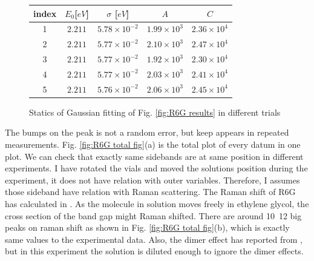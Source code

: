 \documentclass{article}
\begin{document}
\begin{figure}[H]
  \centering
  \begin{tabular}{|c| c| c|c|c|}
      index  & $E_0 $[$eV$]  & $\sigma$ [$eV$] & $A$ & $C$\\
      \hline
      1 & $2.211$ & $5.78\times 10^{-2}$ & $1.99 \times 10^3$ & $2.36 \times 10^4$\\
      2 & $2.211$ & $5.77\times 10^{-2}$ & $2.10 \times 10^3$ & $2.47 \times 10^4$\\
      3 & $2.211$ & $5.77\times 10^{-2}$ & $1.92 \times 10^3$ & $2.30 \times 10^4$\\
      4 & $2.211$ & $5.77\times 10^{-2}$ & $2.03 \times 10^3$ & $2.41 \times 10^4$\\
      5 & $2.211$ & $5.76\times 10^{-2}$ & $2.06 \times 10^3$ & $2.45 \times 10^4$\\
      
  \end{tabular}
  \caption{Statics of Gaussian fitting of Fig. \ref{fig:R6G results} in different trials}
  \label{fig:R6G optimize results}
\end{figure}

The bumps on the peak is not a random error, but keep appears in repeated measurements.
Fig. \ref{fig:R6G total fig}(a) is the total plot of every datum in one plot.
We can check that exactly same sidebands are at same position in different experiments.
I have rotated the vials and moved the solutions position during the experiment, it does not have relation with outer variables.
Therefore, I assumes those sideband have relation with Raman scattering.
The Raman shift of R6G has calculated in \cite{rhodamine_HOMO_LUMO}.
As the molecule in solution moves freely in ethylene glycol, the cross section of the band gap might Raman shifted.
There are around 10~12 big peaks on raman shift as shown in Fig. \ref{fig:R6G total fig}(b), which is exactly same values to the experimental data.
Also, the dimer effect has reported from \cite{Rhodamine_dimer}, but in this experiment the solution is diluted enough to ignore the dimer effects.
\end{document}
